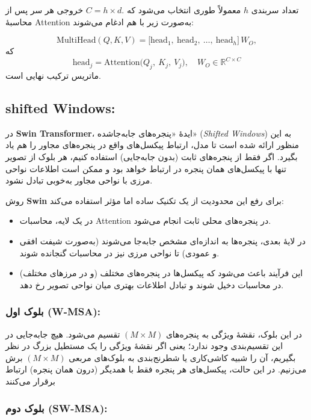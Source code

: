 تعداد سربندی \(\displaystyle h\) معمولاً طوری انتخاب می‌شود که 
\(\displaystyle C = h \times d.\) 
خروجی هر سر پس از محاسبهٔ Attention به‌صورت زیر با هم ادغام می‌شوند:

\[
\mathrm{MultiHead}(Q,K,V) 
= 
\bigl[\text{head}_1,\ \text{head}_2,\ \dots,\ \text{head}_h\bigr]\,
W_O,
\]
که 
\[
\text{head}_j = \mathrm{Attention}\bigl(Q_j,\ K_j,\ V_j\bigr),
\quad 
W_O \in \mathbb{R}^{C \times C}
\]
ماتریس ترکیب نهایی است.
\subsection{shifted Windows:}


در \textbf{Swin Transformer}، ایدهٔ «پنجره‌های جابه‌جاشده» (\textit{Shifted Windows}) 
به این منظور ارائه شده است تا مدل، ارتباط پیکسل‌های واقع در پنجره‌های مجاور را هم یاد بگیرد. 
اگر فقط از پنجره‌های ثابت (بدون جابه‌جایی) استفاده کنیم، هر بلوک از تصویر تنها با پیکسل‌های همان 
پنجره در ارتباط خواهد بود و ممکن است اطلاعات نواحی مرزی با نواحی مجاور به‌خوبی تبادل نشود. 

روش \textbf{Swin} برای رفع این محدودیت از یک تکنیک ساده اما مؤثر استفاده می‌کند:
\begin{itemize}
	\item در یک لایه، محاسبات Attention در پنجره‌های محلی ثابت انجام می‌شود.
	\item در لایهٔ بعدی، پنجره‌ها به اندازه‌ای مشخص جابه‌جا می‌شوند (به‌صورت شیفت افقی و عمودی) 
	تا نواحی مرزی نیز در محاسبات گنجانده شوند.
	\item این فرآیند باعث می‌شود که پیکسل‌ها در پنجره‌های مختلف (و در مرزهای مختلف) 
	در محاسبات دخیل شوند و تبادل اطلاعات بهتری میان نواحی تصویر رخ دهد.
\end{itemize}


\subsubsection{بلوک اول (W-MSA):}

در این بلوک، نقشهٔ ویژگی به پنجره‌های \(\displaystyle (M \times M)\) تقسیم می‌شود. 
هیچ جابه‌جایی در این تقسیم‌بندی وجود ندارد؛ یعنی اگر نقشهٔ ویژگی را یک مستطیل بزرگ در نظر بگیریم، 
آن را شبیه کاشی‌کاری یا شطرنج‌بندی به بلوک‌های مربعی \(\displaystyle (M \times M)\) برش می‌زنیم. 
در این حالت، پیکسل‌های هر پنجره فقط با همدیگر (درون همان پنجره) ارتباط برقرار می‌کنند 



\subsubsection{بلوک دوم (SW-MSA):}


